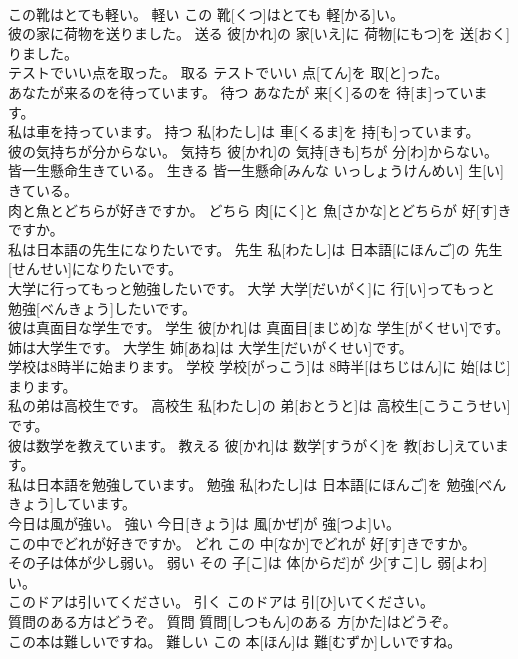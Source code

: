 \documentclass[8pt]{extreport}
\begin{document}
\begin{CJK}{UTF8}{min}
\\	この靴はとても軽い。	軽い	この 靴[くつ]はとても 軽[かる]い。	
\\	彼の家に荷物を送りました。	送る	彼[かれ]の 家[いえ]に 荷物[にもつ]を 送[おく]りました。	
\\	テストでいい点を取った。	取る	テストでいい 点[てん]を 取[と]った。	
\\	あなたが来るのを待っています。	待つ	あなたが 来[く]るのを 待[ま]っています。	
\\	私は車を持っています。	持つ	私[わたし]は 車[くるま]を 持[も]っています。	
\\	彼の気持ちが分からない。	気持ち	彼[かれ]の 気持[きも]ちが 分[わ]からない。	
\\	皆一生懸命生きている。	生きる	皆一生懸命[みんな いっしょうけんめい] 生[い]きている。	
\\	肉と魚とどちらが好きですか。	どちら	肉[にく]と 魚[さかな]とどちらが 好[す]きですか。	
\\	私は日本語の先生になりたいです。	先生	私[わたし]は 日本語[にほんご]の 先生[せんせい]になりたいです。	
\\	大学に行ってもっと勉強したいです。	大学	大学[だいがく]に 行[い]ってもっと 勉強[べんきょう]したいです。	
\\	彼は真面目な学生です。	学生	彼[かれ]は 真面目[まじめ]な 学生[がくせい]です。	
\\	姉は大学生です。	大学生	姉[あね]は 大学生[だいがくせい]です。	
\\	学校は8時半に始まります。	学校	学校[がっこう]は 8時半[はちじはん]に 始[はじ]まります。	
\\	私の弟は高校生です。	高校生	私[わたし]の 弟[おとうと]は 高校生[こうこうせい]です。	
\\	彼は数学を教えています。	教える	彼[かれ]は 数学[すうがく]を 教[おし]えています。	
\\	私は日本語を勉強しています。	勉強	私[わたし]は 日本語[にほんご]を 勉強[べんきょう]しています。	
\\	今日は風が強い。	強い	今日[きょう]は 風[かぜ]が 強[つよ]い。	
\\	この中でどれが好きですか。	どれ	この 中[なか]でどれが 好[す]きですか。	
\\	その子は体が少し弱い。	弱い	その 子[こ]は 体[からだ]が 少[すこ]し 弱[よわ]い。	
\\	このドアは引いてください。	引く	このドアは 引[ひ]いてください。	
\\	質問のある方はどうぞ。	質問	質問[しつもん]のある 方[かた]はどうぞ。	
\\	この本は難しいですね。	難しい	この 本[ほん]は 難[むずか]しいですね。	

\end{CJK}
\end{document}
